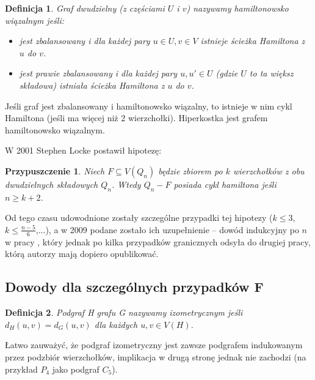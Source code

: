 \documentclass{pracamgr}
\newtheorem{defi}{Definicja}[section] %
\newtheorem{conjecture}{Przypuszczenie}
\begin{document}
    \begin{defi}\label{Hamiltonian lacable}%
     Graf dwudzielny (z częściami $U$ i $v$) nazywamy hamiltonowsko wiązalnym jeśli:
     \begin{itemize}
      \item jest zbalansowany i dla każdej pary $u\in U,v\in V$ istnieje ścieżka Hamiltona z $u$ do $v$.
      \item jest prawie zbalansowany i dla każdej pary $u,u'\in U$ (gdzie $U$ to ta większ składowa) istniała ścieżka Hamiltona
       z $u$ do $v$.
     \end{itemize}
    \end{defi}
    Jeśli graf jest zbalansowany i hamiltonowsko wiązalny, to istnieje w nim cykl Hamiltona (jeśli ma więcej niż 2 wierzchołki).\newline
    Hiperkostka jest grafem hamiltonowsko wiązalnym.\newline

    W 2001 Stephen Locke postawił hipotezę:
    \begin{conjecture}\label{Locke conjecture}
     Niech $F\subseteq V(Q_n)$ będzie zbiorem po $k$ wierzchołków z obu dwudzielnych składowych $Q_n$. Wtedy $Q_n-F$ posiada cykl hamiltona jeśli
     $n\ge k+2$.
    \end{conjecture}
    Od tego czasu udowodnione zostały szczególne przypadki tej hipotezy ($k\le3$, $k\le\frac{n-5}{6}$,...),
    a w 2009 podane zostało ich uzupełnienie -- dowód indukcyjny po $n$ w pracy \cite{Locke}, który jednak po kilka przypadków granicznych odsyła
    do drugiej pracy, którą autorzy mają dopiero opublikować.
    
   \subsection{Dowody dla szczególnych przypadków F}
    \begin{defi}\label{podgraf izometryczny}
     Podgraf H grafu G nazywamy \emph{izometrycznym} jeśli $d_H(u,v)=d_G(u,v)$ dla każdych $u,v\in V(H)$.
    \end{defi}
    Łatwo zauważyć, że podgraf izometryczny jest zawsze podgrafem indukowanym przez podzbiór wierzchołków,
    implikacja w drugą stronę jednak nie zachodzi (na przykład $P_4$ jako podgraf $C_5$).
\end{document}
